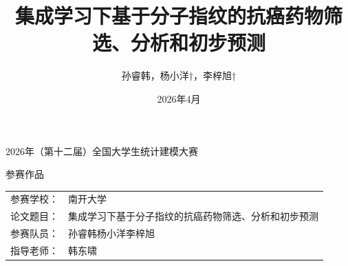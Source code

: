 \documentclass[12pt,a4paper]{article}
\title{\heiti\zihao{3} 集成学习下基于分子指纹的抗癌药物筛选、分析和初步预测}
\author{\songti\zihao{4} 孙睿韩，杨小洋†，李梓旭†}
\date{2026年4月}
\begin{document}
\begin{titlepage}

    \vspace{1.5cm}

    {\centering\xiaobiaosong\fontsize{22}{45}\selectfont
    2026年（第十二届）全国大学生统计建模大赛\par}

    {\centering\xiaobiaosong\fontsize{26}{45}\selectfont
    参\hspace{1em}赛\hspace{1em}作\hspace{1em}品\par}

    \vfill

    \begin{center}
    {\fangsong\fontsize{18}{22}\selectfont
    \setlength{\tabcolsep}{0pt}%
    \begin{tabular}{r@{}p{11.5cm}}
    参赛学校：& 南开大学 \\[2pt]
    论文题目：& 集成学习下基于分子指纹的抗癌药物筛选、分析和初步预测 \\[2pt]
    参赛队员：& 孙睿韩\quad 杨小洋\quad 李梓旭 \\[2pt]
    指导老师：& 韩东啸 \\
    \end{tabular}\par}
    \end{center}
\end{titlepage}
\restoregeometry

\maketitle

\end{document}
